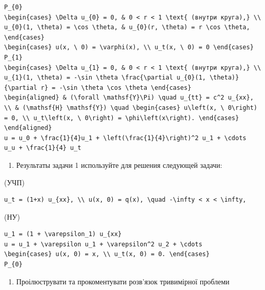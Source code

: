 \documentclass[
  ukrainian,
]{article}
\providecommand{\tightlist}{%
  \setlength{\itemsep}{0pt}\setlength{\parskip}{0pt}}
\begin{document}
\begin{verbatim}
P_{0}
\begin{cases} \Delta u_{0} = 0, & 0 < r < 1 \text{ (внутри круга),} \\ u_{0}(1, \theta) = \cos \theta, & u_{0}(r, \theta) = r \cos \theta, \end{cases}
\begin{cases} u(x, \ 0) = \varphi(x), \\ u_t(x, \ 0) = 0 \end{cases}
P_{1}
\begin{cases} \Delta u_{1} = 0, & 0 < r < 1 \text{ (внутри круга),} \\ u_{1}(1, \theta) = -\sin \theta \frac{\partial u_{0}(1, \theta)}{\partial r} = -\sin \theta \cos \theta \end{cases}
\begin{aligned} & (\forall \mathsf{Y}\Pi) \quad u_{tt} = c^2 u_{xx}, \\ & (\mathsf{H} \mathsf{Y}) \quad \begin{cases} u\left(x, \ 0\right) = 0, \\ u_t\left(x, \ 0\right) = \phi\left(x\right). \end{cases} \end{aligned}
u = u_0 + \frac{1}{4}u_1 + \left(\frac{1}{4}\right)^2 u_1 + \cdots
u_u + \frac{1}{4} u_t
\end{verbatim}

\begin{enumerate}
\def\labelenumi{\arabic{enumi}.}
\setcounter{enumi}{1}
\tightlist
\item
  Результаты задачи 1 используйте для решения следующей задачи:
\end{enumerate}

(УЧП)

\begin{verbatim}
u_t = (1+x) u_{xx}, \\ u(x, 0) = q(x), \quad -\infty < x < \infty,
\end{verbatim}

(НУ)

\begin{verbatim}
u_1 = (1 + \varepsilon_1) u_{xx}
u = u_1 + \varepsilon u_1 + \varepsilon^2 u_2 + \cdots
\begin{cases} u(x, 0) = x, \\ u_t(x, 0) = 0. \end{cases}
P_{0}
\end{verbatim}

\begin{enumerate}
\def\labelenumi{\arabic{enumi}.}
\setcounter{enumi}{2}
\tightlist
\item
  Проілюструвати та прокоментувати розв'язок тривимірної проблеми
\end{enumerate}
\end{document}
